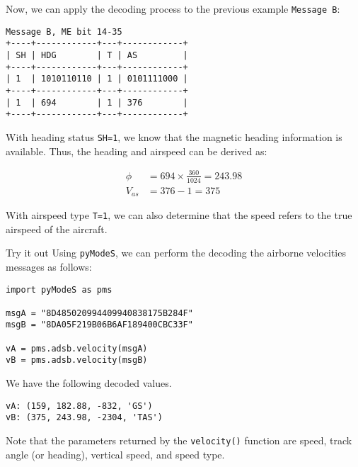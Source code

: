 Now, we can apply the decoding process to the previous example \texttt{Message B}:

\begin{verbatim}
Message B, ME bit 14-35
+----+------------+---+------------+
| SH | HDG        | T | AS         |
+----+------------+---+------------+
| 1  | 1010110110 | 1 | 0101111000 |
+----+------------+---+------------+
| 1  | 694        | 1 | 376        |
+----+------------+---+------------+
\end{verbatim}

With heading status \texttt{SH=1}, we know that the magnetic heading information is available. Thus, the heading and airspeed can be derived as:

\begin{align}
  \phi &= 694 \times \frac{360}{1024} = 243.98 \\
  V_{as} &= 376 - 1 = 375
\end{align}

With airspeed type \texttt{T=1}, we can also determine that the speed refers to the true airspeed of the aircraft.


\begin{notebox}{Try it out}
Using \texttt{pyModeS}, we can perform the decoding the airborne velocities messages as follows: 

\begin{verbatim}
import pyModeS as pms

msgA = "8D485020994409940838175B284F"
msgB = "8DA05F219B06B6AF189400CBC33F"

vA = pms.adsb.velocity(msgA)
vB = pms.adsb.velocity(msgB)
\end{verbatim}

We have the following decoded values.

\begin{verbatim}
vA: (159, 182.88, -832, 'GS')
vB: (375, 243.98, -2304, 'TAS')
\end{verbatim}

Note that the parameters returned by the \texttt{velocity()} function are speed, track angle (or heading), vertical speed, and speed type.

\end{notebox}
  
